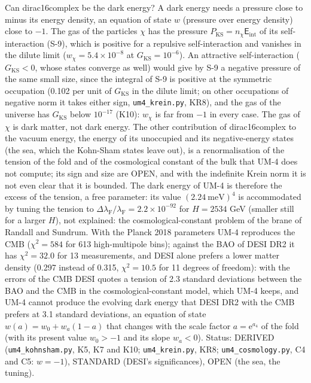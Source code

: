 \documentclass[
  10pt,
]{article}
\begin{document}
Can dirac16complex be the dark energy? A dark energy needs a pressure
close to minus its energy density, an equation of state \(w\) (pressure
over energy density) close to \(-1\). The gas of the particles \(\chi\)
has the pressure \(P_{\mathrm{KS}} = n_\chi\mathsf{E}_{\mathrm{int}}\)
of its self-interaction (S-9), which is positive for a repulsive
self-interaction and vanishes in the dilute limit
(\(w_\chi = 5.4\times10^{-8}\) at \(G_{\mathrm{KS}} = 10^{-6}\)). An
attractive self-interaction (\(G_{\mathrm{KS}} < 0\), whose states
converge as well) would give by S-9 a negative pressure of the same
small size, since the integral of S-9 is positive at the symmetric
occupation (0.102 per unit of \(G_{\mathrm{KS}}\) in the dilute limit;
on other occupations of negative norm it takes either sign,
\texttt{um4\_krein.py}, KR8), and the gas of the universe has
\(G_{\mathrm{KS}}\) below \(10^{-17}\) (K10): \(w_\chi\) is far from
\(-1\) in every case. The gas of \(\chi\) is dark matter, not dark
energy. The other contribution of dirac16complex to the vacuum energy,
the energy of its unoccupied and its negative-energy states (the sea,
which the Kohn-Sham states leave out), is a renormalisation of the
tension of the fold and of the cosmological constant of the bulk that
UM-4 does not compute; its sign and size are OPEN, and with the
indefinite Krein norm it is not even clear that it is bounded. The dark
energy of UM-4 is therefore the excess of the tension, a free parameter:
its value \((2.24\ \text{meV})^4\) is accommodated by tuning the tension
to
\(\Delta\lambda_{\mathrm{F}}/\lambda_{\mathrm{F}} = 2.2\times10^{-92}\)
for \(H = 2534\) GeV (smaller still for a larger \(H\)), not explained:
the cosmological-constant problem of the brane of Randall and Sundrum.
With the Planck 2018 parameters UM-4 reproduces the CMB
(\(\chi^2 = 584\) for 613 high-multipole bins); against the BAO of DESI
DR2 it has \(\chi^2 = 32.0\) for 13 measurements, and DESI alone prefers
a lower matter density (0.297 instead of 0.315, \(\chi^2 = 10.5\) for 11
degrees of freedom): with the errors of the CMB DESI quotes a tension of
2.3 standard deviations between the BAO and the CMB in the
cosmological-constant model, which UM-4 keeps, and UM-4 cannot produce
the evolving dark energy that DESI DR2 with the CMB prefers at 3.1
standard deviations, an equation of state \(w(a) = w_0 + w_a(1 - a)\)
that changes with the scale factor \(a = \mathrm{e}^{a_4}\) of the fold
(with its present value \(w_0 > -1\) and its slope \(w_a < 0\)). Status:
DERIVED (\texttt{um4\_kohnsham.py}, K5, K7 and K10;
\texttt{um4\_krein.py}, KR8; \texttt{um4\_cosmology.py}, C4 and C5:
\(w = -1\)), STANDARD (DESI's significances), OPEN (the sea, the
tuning).
\end{document}
